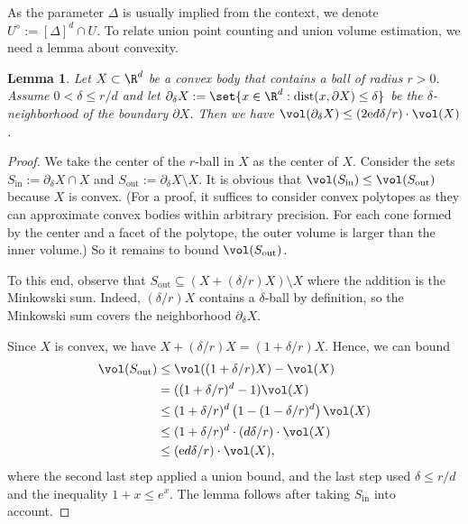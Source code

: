 \documentclass[a4paper, 11pt]{article}
\newtheorem{lemma}[theorem]{Lemma}
\newcommand{\discrete}[1]{#1^\diamond}
\begin{document}
As the parameter $\Delta$ is usually implied from the context, we denote $\discrete{U} := [\Delta]^d \cap U$. To relate union point counting and union volume estimation, we need a lemma about convexity.

\begin{lemma}
    \label{lem:grid}
    Let $X \subset \R^d$ be a convex body that contains a ball of radius $r > 0$. Assume $0 < \delta \leq r/d$ and let $\partial_\delta X := \set{x \in \R^d : \mathrm{dist}(x,\partial X) \leq \delta}$ be the $\delta$-neighborhood of the boundary $\partial X$. Then we have $\vol(\partial_\delta X) \leq (2 \mathrm{e} d \delta / r) \cdot \vol(X)$.
\end{lemma}

\begin{proof}
    We take the center of the $r$-ball in $X$ as the center of $X$. Consider the sets $S_\text{in} := \partial_\delta X \cap X$ and $S_\text{out} := \partial_\delta X \setminus X$. It is obvious that $\vol(S_\text{in}) \leq \vol(S_\text{out})$ because $X$ is convex. (For a proof, it suffices to consider convex polytopes as they can approximate convex bodies within arbitrary precision. For each cone formed by the center and a facet of the polytope, the outer volume is larger than the inner volume.) So it remains to bound $\vol(S_\text{out})$.

    To this end, observe that $S_\text{out} \subseteq (X + (\delta/r) X) \setminus X$ where the addition is the Minkowski sum. Indeed, $(\delta/r) X$ contains a $\delta$-ball by definition, so the Minkowski sum covers the neighborhood $\partial_\delta X$.

    Since $X$ is convex, we have $X + (\delta/r) X = (1+\delta/r) X$. Hence, we can bound
    \begin{align*}
        \vol(S_\text{out})
        &\leq \vol((1+\delta/r)X) - \vol(X) \\
        &= ((1+\delta/r)^d - 1) \vol(X) \\
        &\leq (1+\delta/r)^d \left( 1 - (1 - \delta/r)^d \right) \vol(X) \\
        &\leq (1+\delta/r)^d \cdot (d \delta / r) \cdot \vol(X) \\
        &\leq (\mathrm{e} d \delta/r) \cdot \vol(X),
    \end{align*}
    where the second last step applied a union bound, and the last step used $\delta \leq r/d$ and the inequality $1+x \leq e^x$. The lemma follows after taking $S_\text{in}$ into account.
\end{proof}
\end{document}
